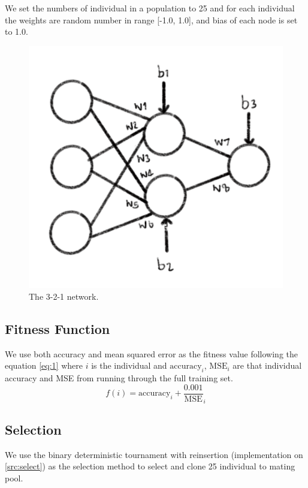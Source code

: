 \documentclass{article}
\begin{document}
We set the numbers of individual in a population to 25 and for each individual the weights are random number in range [-1.0, 1.0], 
and bias of each node is set to 1.0.

\begin{figure}[ht]
    \centering
    \includegraphics[scale = 0.25]{nn_example.jpg}
    \caption{The 3-2-1 network.}
    \label{fig:1}
\end{figure}
\subsection*{Fitness Function}\label{fitness}
We use both accuracy and mean squared error as the fitness value following the equation \cref*{eq:1} where $i$ is the individual
and $\text{accuracy}_i$, $\text{MSE}_i$ are that individual accuracy and MSE from running through the full training set. 
\begin{equation}\label{eq:1}
f(i) = \text{accuracy}_i + \frac{0.001}{\text{MSE}}_i
\end{equation}
\subsection*{Selection}\label{select}
We use the binary deterministic tournament with reinsertion (implementation on \ref{src:select}) 
as the selection method to select and clone 25 individual to mating pool. 
\end{document}
